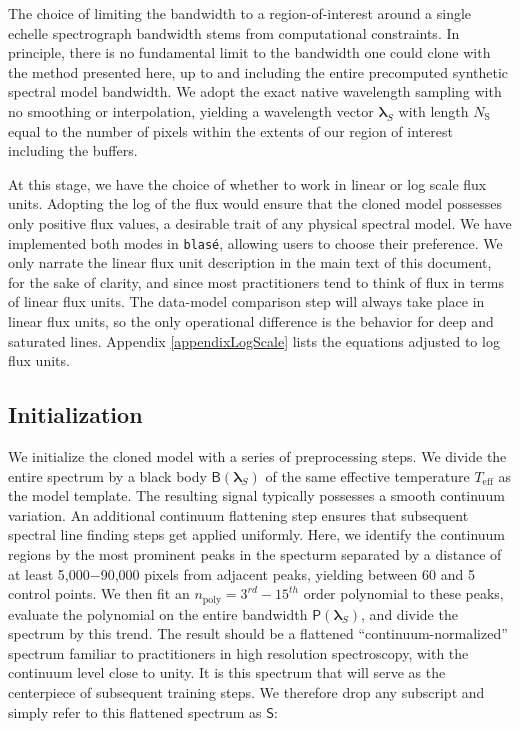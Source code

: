 \documentclass[modern]{aastex631}
\begin{document}
The choice of limiting the bandwidth to a region-of-interest around a single echelle spectrograph bandwidth stems from computational constraints. In principle, there is no fundamental limit to the bandwidth one could clone with the method presented here, up to and including the entire precomputed synthetic spectral model bandwidth. We adopt the exact native wavelength sampling with no smoothing or interpolation, yielding a wavelength vector $\bm{\lambda}_S$ with length $N_\mathrm{S}$ equal to the number of pixels within the extents of our region of interest including the buffers.

At this stage, we have the choice of whether to work in linear or log scale flux units. Adopting the log of the flux would ensure that the cloned model possesses only positive flux values, a desirable trait of any physical spectral model. We have implemented both modes in \texttt{blas\'e}, allowing users to choose their preference.  We only narrate the linear flux unit description in the main text of this document, for the sake of clarity, and since most practitioners tend to think of flux in terms of linear flux units.  The data-model comparison step will always take place in linear flux units, so the only operational difference is the behavior for deep and saturated lines.  Appendix \ref{appendixLogScale} lists the equations adjusted to log flux units.

\subsection{Initialization}

We initialize the cloned model with a series of preprocessing steps. We divide the entire spectrum by a black body $\mathsf{B}(\bm{\lambda}_S)$ of the same effective temperature $T_{\mathrm{eff}}$ as the model template. The resulting signal typically possesses a smooth continuum variation. An additional continuum flattening step ensures that subsequent spectral line finding steps get applied uniformly. Here, we identify the continuum regions by the most prominent peaks in the specturm separated by a distance of at least 5,000$-$90,000 pixels from adjacent peaks, yielding between 60 and 5 control points. We then fit an $n_{\mathrm{poly}} = 3^{rd}-15^{th}$ order polynomial to these peaks, evaluate the polynomial on the entire bandwidth $\mathsf{P}(\bm{\lambda}_S)$, and divide the spectrum by this trend. The result should be a flattened ``continuum-normalized'' spectrum familiar to practitioners in high resolution spectroscopy, with the continuum level close to unity.  It is this spectrum that will serve as the centerpiece of subsequent training steps.  We therefore drop any subscript and simply refer to this flattened spectrum as $\mathsf{S}$:
\end{document}
